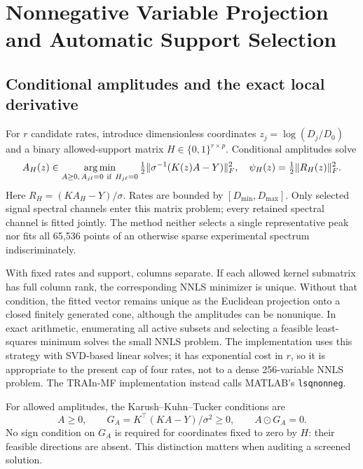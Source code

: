 \section{Nonnegative Variable Projection and Automatic Support Selection}\label{sec:algorithm}
\subsection{Conditional amplitudes and the exact local derivative}
For $r$ candidate rates, introduce dimensionless coordinates $z_j=\log(D_j/D_0)$ and a binary allowed-support matrix $H\in\{0,1\}^{r\times p}$. Conditional amplitudes solve
\begin{equation}\label{eq:nnls}
 A_H(z)\in\operatorname*{arg\,min}_{A\geq0,\,A_{j\ell}=0\ \mathrm{if}\ H_{j\ell}=0}
 \tfrac12\|\sigma^{-1}(K(z)A-Y)\|_F^2,
 \quad \psi_H(z)=\tfrac12\|R_H(z)\|_F^2.
\end{equation}
Here $R_H=(KA_H-Y)/\sigma$. Rates are bounded by $[D_{\min},D_{\max}]$. Only selected signal spectral channels enter this matrix problem; every retained spectral channel is fitted jointly. The method neither selects a single representative peak nor fits all 65,536 points of an otherwise sparse experimental spectrum indiscriminately.

With fixed rates and support, columns separate. If each allowed kernel submatrix has full column rank, the corresponding NNLS minimizer is unique. Without that condition, the fitted vector remains unique as the Euclidean projection onto a closed finitely generated cone, although the amplitudes can be nonunique. In exact arithmetic, enumerating all active subsets and selecting a feasible least-squares minimum solves the small NNLS problem. The implementation uses this strategy with SVD-based linear solves; it has exponential cost in $r$, so it is appropriate to the present cap of four rates, not to a dense 256-variable NNLS problem. The TRAIn-MF implementation instead calls MATLAB's \texttt{lsqnonneg}.

For allowed amplitudes, the Karush--Kuhn--Tucker conditions are
\begin{equation}\label{eq:kkt}
 A\geq0,\qquad G_A=K^\top(KA-Y)/\sigma^2\geq0,\qquad A\odot G_A=0.
\end{equation}
No sign condition on $G_A$ is required for coordinates fixed to zero by $H$: their feasible directions are absent. This distinction matters when auditing a screened solution.


